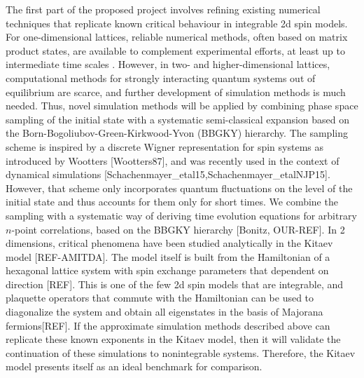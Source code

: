 \documentclass[a4paper,11pt,color]{article}
\begin{document}
The first part of the proposed project involves refining existing numerical techniques that replicate known critical behaviour in integrable 2d spin models.  For one-dimensional lattices, reliable numerical methods, often based on matrix product states, are available to complement experimental efforts, at least up to intermediate time scales \cite{Schollwoeck11}. However, in two- and higher-dimensional lattices, computational methods for strongly interacting quantum systems out of equilibrium are scarce, and further development of simulation methods is much needed. Thus, novel simulation methods will be applied by combining phase space sampling of the initial state with a systematic semi-classical expansion based on the Born-Bogoliubov-Green-Kirkwood-Yvon (BBGKY) hierarchy. The sampling scheme is inspired by a discrete Wigner representation for spin systems as introduced by Wootters [Wootters87], and was recently used in the context of dynamical simulations [Schachenmayer\_etal15,Schachenmayer\_etalNJP15]. However, that scheme only incorporates quantum fluctuations on the level of the initial state and thus accounts for them only for short times. We combine the sampling with a systematic way of deriving time evolution equations for arbitrary $n$-point correlations, based on the BBGKY hierarchy [Bonitz, OUR-REF].  In 2 dimensions, critical phenomena have been studied analytically in the Kitaev model [REF-AMITDA]. The model itself is built from the Hamiltonian of a hexagonal lattice system with spin exchange parameters that dependent on direction [REF]. This is one of the few 2d spin models that are integrable, and plaquette operators that commute with the Hamiltonian can be used to diagonalize the system and obtain all eigenstates in the basis of Majorana fermions[REF]. If the approximate simulation methods described above can replicate these known exponents in the Kitaev model, then it will validate the continuation of these simulations to nonintegrable systems. Therefore, the Kitaev model presents itself as  an ideal benchmark for comparison. 
\end{document}
